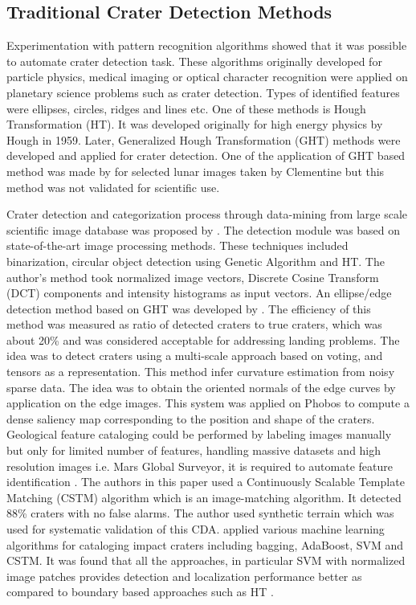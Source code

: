 \documentclass[11pt]{article}
\begin{document}
\subsection{Traditional Crater Detection Methods}
Experimentation with pattern recognition algorithms showed that it was possible to automate crater detection task. These algorithms originally developed for particle physics, medical imaging or optical character recognition were applied on planetary science problems such as crater detection. Types of identified features were ellipses, circles, ridges and lines etc. One of these methods is Hough Transformation (HT). It was developed originally for high energy physics by Hough in 1959. Later, Generalized Hough Transformation (GHT) methods were developed and applied for crater detection. One of the application of GHT based method was made by \cite{honda2000crater} for selected lunar images taken by Clementine but this method was not validated for scientific use.

Crater detection and categorization process through data-mining from large scale scientific image database was proposed by \cite{honda2000crater}. The detection module was based on state-of-the-art image processing methods. These techniques included binarization, circular object detection using Genetic Algorithm and HT. The author's method took normalized image vectors, Discrete Cosine Transform (DCT) components and intensity histograms as input vectors. An ellipse/edge detection method based on GHT was developed by \cite{leroy2001crater}. The efficiency of this method was measured as ratio of detected craters to true craters, which was about 20\% and was considered acceptable for addressing landing problems. The idea was to detect craters using a multi-scale approach based on voting, and tensors as a representation. This method infer curvature estimation from noisy sparse data. The idea was to obtain the oriented normals of the edge curves by application on the edge images. This system was applied on Phobos to compute a dense saliency map corresponding to the position and shape of the craters. Geological feature cataloging could be performed by labeling images manually but only for limited number of features, handling massive datasets and high resolution images i.e. Mars Global Surveyor, it is required to automate feature identification \cite{vinogradova2002training}. The authors in this paper used a Continuously Scalable Template Matching (CSTM) algorithm which is an image-matching algorithm. It detected 88\% craters with no false alarms. The author used synthetic terrain which was used for systematic validation of this CDA. \cite{wetzler2005learning} applied various machine learning algorithms for cataloging impact craters including bagging, AdaBoost, SVM and CSTM. It was found that all the approaches, in particular SVM with normalized image patches provides detection and localization performance better as compared to boundary based approaches such as HT \cite{wetzler2005learning}.
\end{document}
